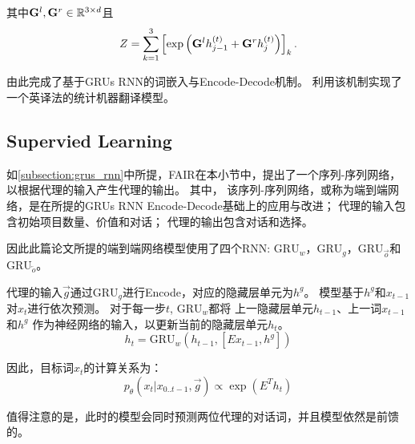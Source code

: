 其中$\mathbf{G}^l, \mathbf{G}^r \in \mathbb{R}^{3 \times d}$且
\begin{equation}
    Z = \sum_{k=1}^3 \left[\exp\left( \mathbf{G}^l h^{(t)}_{j-1} + \mathbf{G}^r h^{(t)}_{j} \right)\right]_k.
\end{equation}

由此完成了基于GRUs RNN的词嵌入与Encode-Decode机制。
\citet{  Cho-18,  Cho-28}利用该机制实现了一个英译法的统计机器翻译模型。

\subsection{Supervied Learning}
\label{subsection:supervised_learning}

如\ref{subsection:grus_rnn}中所提，FAIR在本小节中，提出了一个序列-序列网络，以根据代理的输入产生代理的输出。
其中，
该序列-序列网络，或称为端到端网络，是在\citet{  Cho-18,  Cho-28}所提的GRUs RNN Encode-Decode基础上的应用与改进；
代理的输入包含初始项目数量、价值和对话；
代理的输出包含对话和选择。

因此此篇论文所提的端到端网络模型使用了四个RNN:
$\text{GRU}_w$，$\text{GRU}_g$，$\text{GRU}_{\overrightarrow{o}}$和$\text{GRU}_{\overleftarrow{o}}$。


代理的输入$\vec{g}$通过$\text{GRU}_g$进行Encode，对应的隐藏层单元为$h^g$。
模型基于$h^g$和$x_{t-1}$对$x_t$进行依次预测。
对于每一步$t$, $\text{GRU}_w$都将
上一隐藏层单元$h_{t-1}$、上一词$x_{t-1}$和$h^g$
作为神经网络的输入，以更新当前的隐藏层单元$h_t$。
\begin{equation}
h_t = \text{GRU}_w(h_{t-1}, [Ex_{t-1}, h^g])
\end{equation}

因此，目标词$x_t$的计算关系为：
\begin{equation}
p_\theta (x_t | x_{0.. t-1}, \vec{g}) \propto \exp(E^T h_t)
\end{equation}

值得注意的是，此时的模型会同时预测两位代理的对话词，并且模型依然是前馈的。

